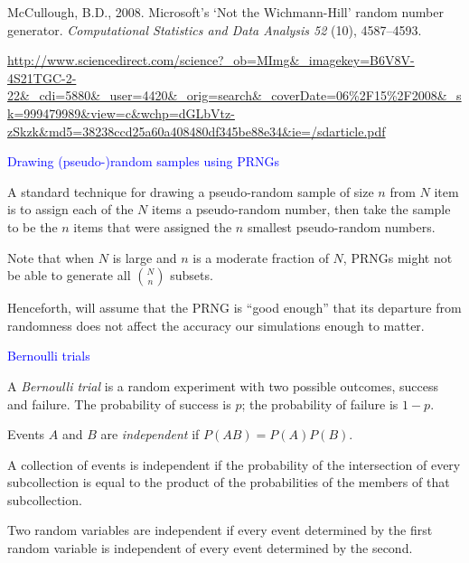 \documentclass[landscape]{slides}
\begin{document}
\begin{slide}


McCullough, B.D., 2008. Microsoft's `Not the Wichmann-Hill' random number generator. 
{\em Computational Statistics and Data Analysis 52\/} (10), 4587--4593.

\url{http://www.sciencedirect.com/science?_ob=MImg&_imagekey=B6V8V-4S21TGC-2-22&_cdi=5880&_user=4420&_orig=search&_coverDate=06\%2F15\%2F2008&_sk=999479989&view=c&wchp=dGLbVtz-zSkzk&md5=38238ccd25a60a408480df345be88e34&ie=/sdarticle.pdf}

\end{slide}

\begin{slide}
{\textcolor{blue}{Drawing (pseudo-)random samples using PRNGs}}

A standard technique for drawing a pseudo-random sample of size $n$ from
$N$ item is to assign each of the $N$ items a pseudo-random number, then take the
sample to be the $n$ items that were assigned the $n$ smallest pseudo-random numbers.

Note that when $N$ is large and $n$ is a moderate fraction of $N$, PRNGs might
not be able to generate all ${{N}\choose{n}}$ subsets.

Henceforth, will assume that the PRNG is ``good enough'' that its departure from
randomness does not affect the accuracy our simulations enough to matter.
\end{slide}

\begin{slide}
{\textcolor{blue}{Bernoulli trials}}

A {\em Bernoulli trial\/} is a random experiment with two possible outcomes, success and failure. 
The probability of success is $p$; the probability of failure is $1-p$. 

Events $A$ and $B$ are {\em independent\/} if $P(AB) = P(A)P(B)$. 

A collection of events is independent if the probability of the intersection of every subcollection is equal to the product of the probabilities of the members of that subcollection. 

Two random variables are independent if every event determined by the first random variable is independent of every event determined by the second.

\end{slide}
\end{document}

